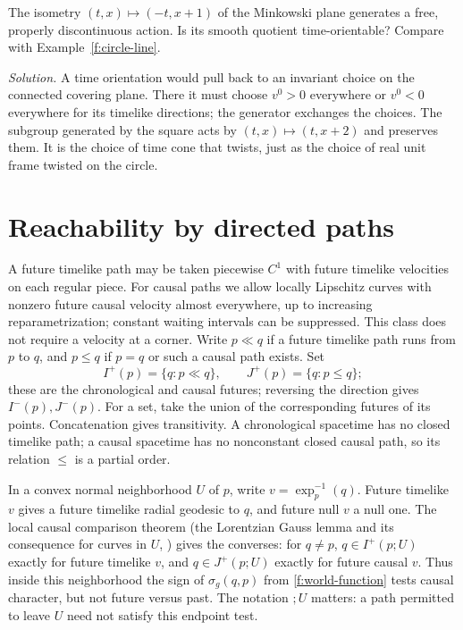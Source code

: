\begin{exercise}
The isometry $(t,x)\mapsto(-t,x+1)$ of the Minkowski plane generates a free, properly discontinuous action. Is its smooth quotient time-orientable? Compare with Example~\ref{f:circle-line}.

\emph{Solution.} A time orientation would pull back to an invariant choice on the connected covering plane. There it must choose $v^0>0$ everywhere or $v^0<0$ everywhere for its timelike directions; the generator exchanges the choices. The subgroup generated by the square acts by $(t,x)\mapsto(t,x+2)$ and preserves them. It is the choice of time cone that twists, just as the choice of real unit frame twisted on the circle.
\end{exercise}

\section{Reachability by directed paths}

A future timelike path may be taken piecewise $C^1$ with future timelike velocities on each regular piece. For causal paths we allow locally Lipschitz curves with nonzero future causal velocity almost everywhere, up to increasing reparametrization; constant waiting intervals can be suppressed. This class does not require a velocity at a corner. Write $p\ll q$ if a future timelike path runs from $p$ to $q$, and $p\leq q$ if $p=q$ or such a causal path exists. Set
\[
 I^+(p)=\{q:p\ll q\},\qquad J^+(p)=\{q:p\leq q\};
\]
these are the chronological and causal futures; reversing the direction gives $I^-(p),J^-(p)$. For a set, take the union of the corresponding futures of its points. Concatenation gives transitivity. A chronological spacetime has no closed timelike path; a causal spacetime has no nonconstant closed causal path, so its relation $\leq$ is a partial order.

In a convex normal neighborhood $U$ of $p$, write $v=\exp_p^{-1}(q)$. Future timelike $v$ gives a future timelike radial geodesic to $q$, and future null $v$ a null one. The local causal comparison theorem (the Lorentzian Gauss lemma and its consequence for curves in $U$, \cite[Ch.~5]{ON}) gives the converses: for $q\ne p$, $q\in I^+(p;U)$ exactly for future timelike $v$, and $q\in J^+(p;U)$ exactly for future causal $v$. Thus inside this neighborhood the sign of $\sigma_g(q,p)$ from \eqref{f:world-function} tests causal character, but not future versus past. The notation $;U$ matters: a path permitted to leave $U$ need not satisfy this endpoint test.

